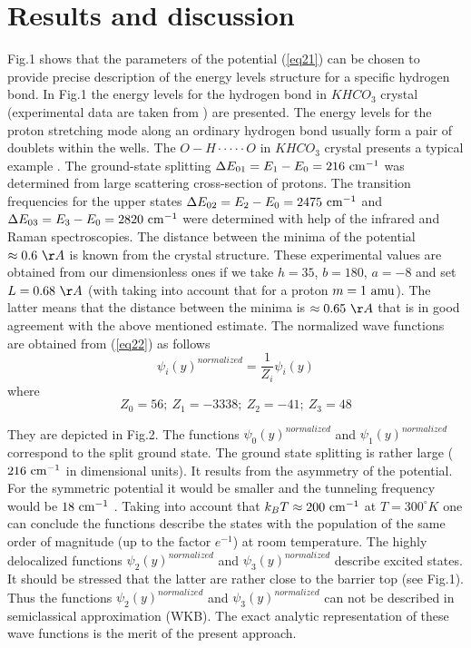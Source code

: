 \documentclass[singlespacing]{elsart}
\begin{document}
\section{Results and discussion}
Fig.1 shows that the parameters of the potential (\ref{eq21}) can be chosen to provide precise description of the energy levels structure for a specific hydrogen bond. In Fig.1 the energy levels for the hydrogen bond in $KHCO_3$ crystal (experimental data are taken from \cite{Fil07}) are presented. The energy levels for the proton stretching mode along an ordinary hydrogen bond usually form a pair of doublets within the wells. The $O-H \cdot\cdot\cdot\cdot\cdot O$ in $KHCO_3$ crystal presents a typical example \cite{Fil07}. The ground-state splitting $\Delta E_{01}=E_1-E_0=216\ {\rm cm^{-1}}$ was determined from large scattering cross-section of protons. The transition frequencies for the upper states $\Delta E_{02}=E_2-E_0=2475\ {\rm cm^{-1}}$ and $\Delta E_{03}=E_3-E_0=2820\ {\rm cm^{-1}}$ were determined with help of the infrared and Raman spectroscopies. The distance between the minima of the potential $\approx 0.6\ \AA$ is known from the crystal structure. These experimental values are obtained from our dimensionless ones if we take $h=35$, $b=180$, $a=-8$ and set $L=0.68\ \AA$ (with taking into account that for a proton $m=1\ {\rm amu}$). The latter means that the distance between the minima is $\approx 0.65\ \AA$ that is in good agreement with the above mentioned estimate. The normalized wave functions are obtained from (\ref{eq22}) as follows
\begin{equation}
\label{eq24} \psi_i(y)^{normalized}=\frac{1}{Z_i}\psi_i(y)
\end{equation}
where
\begin{equation}
\label{eq25} Z_0=56;\ Z_1=-3338;\ Z_2=-41;\ Z_3=48
\end{equation}

They are depicted in Fig.2. The functions $\psi_0(y)^{normalized}$ and $\psi_1(y)^{normalized}$ correspond to the split ground state. The ground state splitting is rather large ($216\ {\rm cm^{-1}}$ in dimensional units). It results from the asymmetry of the potential. For the symmetric potential it would be smaller and the tunneling frequency would be $18\ {\rm cm^{-1}}$ \cite{Fil07}. Taking into account that $k_BT \approx 200\ {\rm cm^{-1}}$ at $T=300^{\circ} K$ one can conclude the functions describe the states with the population of the same order of magnitude (up to the factor $e^{-1}$) at room temperature. The highly delocalized functions $\psi_2(y)^{normalized}$ and $\psi_3(y)^{normalized}$ describe excited states. It should be stressed that the latter are rather close to the barrier top (see Fig.1). Thus the functions $\psi_2(y)^{normalized}$ and $\psi_3(y)^{normalized}$ can not be described in semiclassical approximation (WKB). The exact analytic representation of these wave functions is the merit of the present approach.
\end{document}
